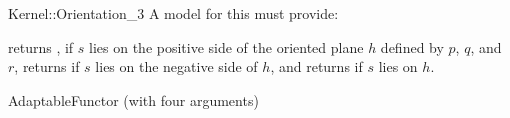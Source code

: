 \begin{ccRefFunctionObjectConcept}{Kernel::Orientation_3}
A model for this must provide:


{returns , if $s$ lies on the positive side of the oriented 
plane $h$ defined by $p$, $q$, and $r$, returns  if $s$ 
lies on the negative side of $h$, and returns  if $s$ lies
on $h$.}

\ccRefines
AdaptableFunctor (with four arguments)

\ccSeeAlso
{} \\


\end{ccRefFunctionObjectConcept}
